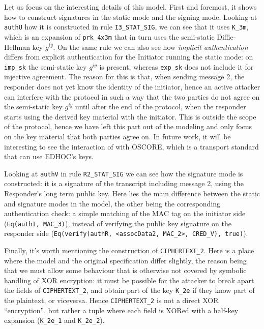 Let us focus on the interesting details of this model. First and
foremost, it shows how to construct signatures in the static mode and
the signing mode.
%
Looking at \lstinline{authU} how it is constructed in rule
\lstinline{I3_STAT_SIG}, we can see that it uses \lstinline{K_3m},
which is an expansion of \lstinline{prk_4x3m} that in turn uses the
semi-static Diffie-Hellman key $g^{iy}$.
%
On the same rule we can also see how \emph{implicit authentication}
differs from explicit authentication for the Initiator running the
static mode: on \lstinline{imp_sk} the semi-static key
$g^{iy}$ is present, whereas \lstinline{exp_sk} does not include it
for injective agreement.
%
The reason for this is that, when sending message 2, the responder
does not yet know the identity of the initiator, hence an active
attacker can interfere with the protocol in such a way that the two
parties do not agree on the semi-static key
$g^{iy}$ until after the end of the protocol, when the responder
starts using the derived key material with the initiator.
%
This is outside the scope of the \mEdhoc protocol, hence we have left
this part out of the modeling and only focus on the key material that
both parties agree on.
%
In future work, it will be interesting to see the interaction of
\mEdhoc with OSCORE, which is a transport standard that can use
EDHOC's keys.

Looking at \lstinline{authV} in rule \lstinline{R2_STAT_SIG} we can
see how the signature mode is constructed: it is a signature of the
transcript including message 2, using the Responder's long term public
key.
%
Here lies the main difference between the static and signature modes
in the model, the other being the corresponding authentication check:
a simple matching of the MAC tag on the initiator side
%
(\lstinline{Eq(authI, MAC_3)}), instead of verifying the public key
signature on the responder side
%
(\lstinline{Eq(verify(authR, <assocData2, MAC_2>, CRED_V), true)}).

Finally, it's worth mentioning the construction of
\lstinline{CIPHERTEXT_2}.
%
Here is a place where the model and the original specification differ
slightly, the reason being that we must allow some behaviour that is
otherwise not covered by symbolic handling of XOR encryption: it must
be possible for the attacker to break apart the fields of
\lstinline{CIPHERTEXT_2}, and obtain part of the key \lstinline{K_2e}
if they know part of the plaintext, or viceversa.
%
Hence \lstinline{CIPHERTEXT_2} is not a direct XOR ``encryption'', but
rather a tuple where each field is XORed with a half-key expansion
(\lstinline{K_2e_1} and \lstinline{K_2e_2}).

